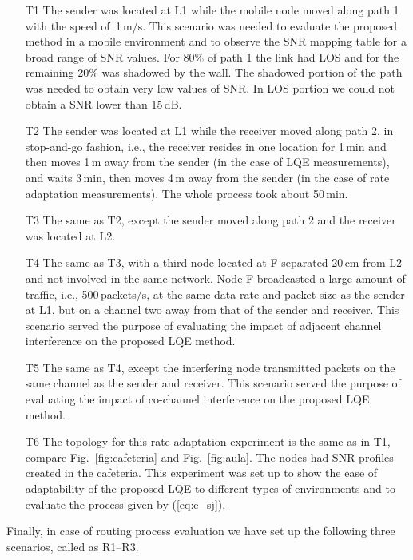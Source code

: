 \documentclass[11pt,draftclsnofoot,journal,onecolumn]{IEEEtran}
\begin{document}
\begin{itemize}
\item[T1]
The sender was located at L1 while the mobile node moved along path 1 with the speed of \,1\,m/s. This scenario was needed to evaluate the proposed method in a mobile environment and to observe the SNR mapping table for a broad range of SNR values. For 80\% of path 1 the link had LOS and for the remaining 20\% was shadowed by the wall. The shadowed portion of the path was needed to obtain very low values of SNR. In LOS portion we could not obtain a SNR lower than 15\,dB. 

\item[T2]
The sender was located at L1 while the receiver moved along path 2, in stop-and-go fashion, i.e., the receiver resides in one location for 1\,min and then moves 1\,m away from the sender (in the case of LQE measurements), and waits 3\,min, then moves 4\,m away from the sender (in the case of rate adaptation measurements). The whole process took about 50\,min. 

\item[T3]
The same as T2, except the sender moved along path 2 and the receiver was located at L2.

\item[T4]
The same as T3, with a third node located at F separated 20\,cm from L2 and not involved in the same network. Node F broadcasted a large amount of traffic, i.e., 500\,packets/s, at the same data rate and packet size as the sender at L1, but on a channel two away from that of the sender and receiver. This scenario served the purpose of evaluating the impact of adjacent channel interference on the proposed LQE method.

\item[T5]
The same as T4, except the interfering node transmitted packets on the same channel as the sender and receiver. This scenario served the purpose of evaluating the impact of co-channel interference on the proposed LQE method.

\item[T6]
The topology for this rate adaptation experiment is the same as in T1, compare Fig.~\ref{fig:cafeteria} and Fig.~\ref{fig:aula}. The nodes had SNR profiles created in the cafeteria. This experiment was set up to show the ease of adaptability of the proposed LQE to different types of environments and to evaluate the process given by (\ref{eq:e_sj}).
\end{itemize}

Finally, in case of routing process evaluation we have set up the following three scenarios, called as R1--R3.
\end{document}
